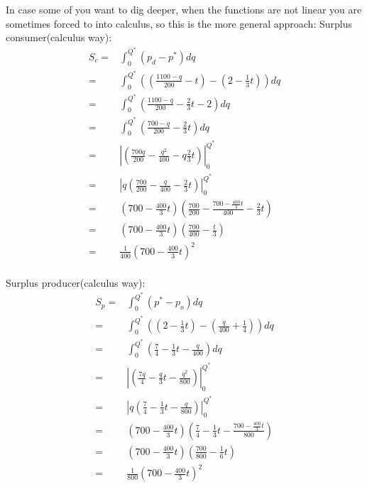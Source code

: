 \documentclass[12pt]{report}
\numberwithin{equation}{section}
\begin{document}
In case some of you want to dig deeper, when the functions are not linear you are sometimes forced to into calculus, so this is the more general approach: 
Surplus consumer(calculus way):
\begin{align*}
S_c = &\int^{Q^*}_{0} (p_d - p^*)dq \\
= &\int^{Q^*}_{0} \left(\left(\frac{1100-q}{200}-t \right)-\left(2 - \frac{1}{3}t \right) \right) dq \\
= &\int^{Q^*}_{0} \left(\frac{1100-q}{200}-\frac{2}{3}t -2 \right)  dq \\
= &\int^{Q^*}_{0} \left(\frac{700-q}{200}-\frac{2}{3}t \right)  dq \\
= &\left| \left(\frac{700q}{200}-\frac{q^2}{400}-q\frac{2}{3}t \right) \right|^{Q^*}_0  \\
= &\left| q \left(\frac{700}{200}-\frac{q}{400}-\frac{2}{3}t \right) \right|^{Q^*}_0  \\
= & \left(700 - \frac{400}{3}t \right) \left(\frac{700}{200}-\frac{700 - \frac{400}{3}t }{400}-\frac{2}{3}t \right)  \\
= & \left(700 - \frac{400}{3}t \right) \left(\frac{700}{400}-\frac{ t }{3} \right)  \\
= &\frac{1}{400} \left(700 - \frac{400}{3}t \right)^2   \\
\end{align*}

Surplus producer(calculus way):
\begin{align*}
S_p = &\int^{Q^*}_{0} (p^* - p_o)dq \\
= &\int^{Q^*}_{0} \left(\left(2 - \frac{1}{3}t\right) - \left(\frac{q}{400} + \frac{1}{4} \right) \right) dq \\
= &\int^{Q^*}_{0} \left( \frac{7}{4} - \frac{1}{3}t - \frac{q}{400}  \right) dq \\
= &\left|  \left( \frac{7q}{4} - \frac{q}{3}t - \frac{q^2}{800}  \right) \right|^{Q^*}_0\\
= &\left| q\left( \frac{7}{4} - \frac{1}{3}t - \frac{q}{800}  \right) \right|^{Q^*}_0\\
= & \left( 700 - \frac{400}{3}t \right) \left( \frac{7}{4} - \frac{1}{3}t - \frac{700 - \frac{400}{3}t}{800}  \right) \\
= & \left( 700 - \frac{400}{3}t \right) \left( \frac{700}{800} - \frac{1}{6}t  \right) \\
= & \frac{1}{800} \left( 700 - \frac{400}{3}t \right)^2 \\
\end{align*}


\end{document}
